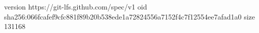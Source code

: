 version https://git-lfs.github.com/spec/v1
oid sha256:066fcafef9cfc881f89b20b538ede1a72824556a7152f4c7f12554ee7afad1a0
size 131168
